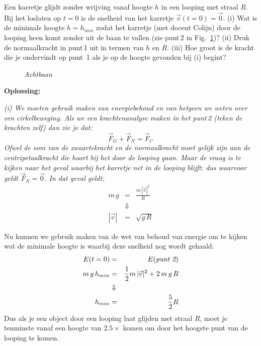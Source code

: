 \begin{voorbeeld} \label{ex:achtbaan}

Een karretje glijdt zonder wrijving vanaf hoogte $h$ in een looping met straal $R$. Bij het
loslaten op $t=0$ is de snelheid van het karretje $\vec{v}(t=0)=\vec{0}$. (i) Wat is de minimale hoogte $h=h_{min}$ zodat het karretje (met docent Colijn) door de looping heen komt zonder uit
de baan te vallen (zie punt\,2 in Fig.~\ref{fig:achtbaan})? (ii) Druk de normaalkracht in punt\,1 
uit in termen van $h$ en $R$. (iii) Hoe groot is de kracht die je ondervindt op punt~1 als je op
de hoogte gevonden bij (i) begint?
 \begin{figure}[htbp]
\begin{center}
\caption{{\it Achtbaan}}
\label{fig:achtbaan}
\end{center}
\end{figure} 

{\bf Oplossing: }{\it (i) We moeten gebruik maken van energiebehoud en van hetgeen we
weten over een cirkelbeweging. Als we een krachtenanalyse maken in het punt\,2  
(teken de krachten zelf) dan zie je dat:
\begin{equation}
\vec{F}_G+\vec{F}_N = \vec{F}_C
\end{equation}
Ofwel de som van de zwaartekracht en de normaalkracht moet gelijk zijn aan de centripetaalkracht
die hoort bij het door de looping gaan. Maar de vraag is te kijken naar het geval waarbij 
het karretje net in de looping blijft: dus waarvoor geldt $\vec{F}_N = \vec{0}$. In dat geval geldt:
\begin{eqnarray}
m\,g & = & \frac{m\,|\vec{v}|^2}{R} \\
& \Downarrow & \\
|\vec{v}| & =  & \sqrt{g \, R}
\end{eqnarray}

Nu kunnen we gebruik maken van de wet van behoud van energie om te kijken wat de minimale hoogte is waarbij deze snelheid nog wordt gehaald:
\begin{eqnarray}
E(t=0)& = & E(\mbox{{\it punt 2}}) \\
m\,g\,h_{min} & = & \frac{1}{2}m\,|\vec{v}|^2 + 2\,m\,g\,R \\
& \Downarrow & \\
h_{min} & = & \frac{5}{2} R
\end{eqnarray}
Dus als je een object door een looping laat glijden met straal $R$, moet je tenminste 
vanaf een hoogte van $2.5\times$ komen om door het hoogste punt van de looping
te komen.

}
\end{voorbeeld}
